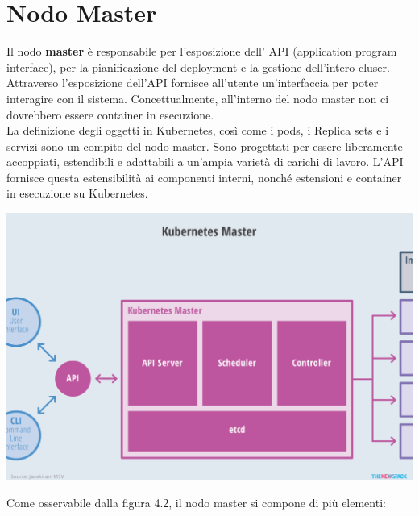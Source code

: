 \documentclass[12pt, a4paper]{report}
\begin{document}
\section{Nodo Master}
Il nodo \textbf{master} è responsabile per l'esposizione dell' API (application program interface), per la pianificazione del deployment e la gestione dell'intero cluser. Attraverso l'esposizione dell'API fornisce all'utente un'interfaccia per poter interagire con il sistema. Concettualmente, all'interno del nodo master non ci dovrebbero essere container in esecuzione.\\
La definizione degli oggetti in Kubernetes, così come i pods, i Replica sets e i servizi sono un compito del nodo master. Sono progettati per essere liberamente accoppiati, estendibili e adattabili a un'ampia varietà di carichi di lavoro. L'API fornisce questa estensibilità ai componenti interni, nonché estensioni e container in esecuzione su Kubernetes.
\begin{center}
  \includegraphics[scale=0.5]{Images/Kubernetes-master}
\end{center}
Come osservabile dalla figura 4.2, il nodo master si compone di più elementi:
\end{document}
